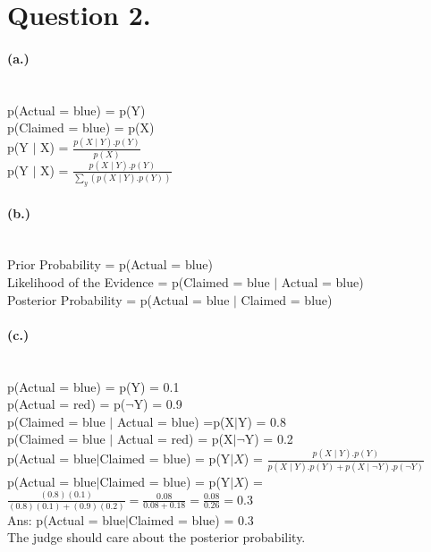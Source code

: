 \documentclass{article}
\begin{document}
\section{Question 2.}
\paragraph{(a.)}
\\p(Actual = blue) = p(Y)
\\p(Claimed = blue) = p(X)
\\p(Y $\mid$ X) = $\frac{p(X\mid Y).p(Y)}{p(X)}$
\\p(Y $\mid$ X) = $\frac{p(X\mid Y).p(Y)}{\sum_{y}(p(X \mid Y).p(Y))}$

\paragraph{(b.)}
\\Prior Probability = p(Actual = blue)
\\Likelihood of the Evidence = p(Claimed = blue $\mid$ Actual = blue)
\\Posterior Probability = p(Actual = blue $\mid$ Claimed = blue)
\paragraph{(c.)}
\\p(Actual = blue) = p(Y) = 0.1
\\p(Actual = red) = p($\neg$Y) = 0.9
\\p(Claimed = blue $\mid$ Actual = blue) =p(X$\mid$Y) = 0.8
\\p(Claimed = blue $\mid$ Actual = red) = p(X$\mid \neg$Y) = 0.2
\\p(Actual = blue$\mid$Claimed = blue) = p(Y$\mid X$) = $\frac{p(X\mid Y).p(Y)}{p(X \mid Y).p(Y)+ p(X \mid \neg Y).p(\neg Y)}$ 
\\p(Actual = blue$\mid$Claimed = blue) = p(Y$\mid X$) = $\frac{(0.8)(0.1)}{(0.8)(0.1)+(0.9)(0.2)}= \frac{0.08}{0.08+0.18}=\frac{0.08}{0.26}=0.3$
\\Ans: p(Actual = blue$\mid$Claimed = blue) = 0.3
\\The judge should care about the posterior probability. 
\end{document}
